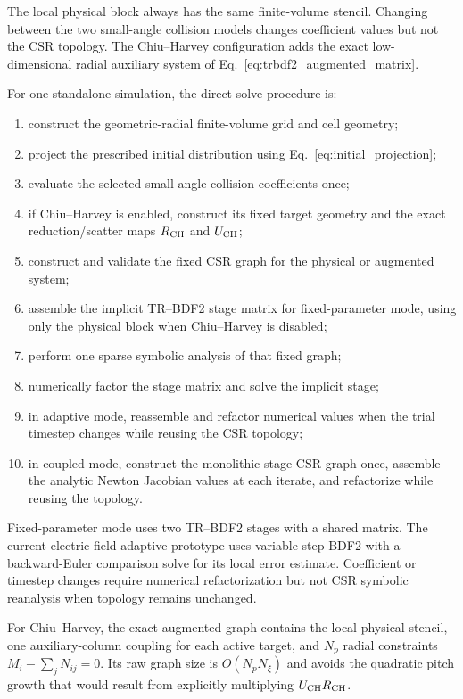 \documentclass[11pt]{article}
\begin{document}
The local physical block always has the same finite-volume stencil.  Changing between
the two small-angle collision models changes coefficient values but not the CSR topology.
The Chiu--Harvey configuration adds the exact low-dimensional radial auxiliary system of
Eq.~\eqref{eq:trbdf2_augmented_matrix}.

For one standalone simulation, the direct-solve procedure is:
\begin{enumerate}
 \item construct the geometric-radial finite-volume grid and cell geometry;
 \item project the prescribed initial distribution using Eq.~\eqref{eq:initial_projection};
 \item evaluate the selected small-angle collision coefficients once;
 \item if Chiu--Harvey is enabled, construct its fixed target geometry and the exact
       reduction/scatter maps $R_{\rm CH}$ and $U_{\rm CH}$;
 \item construct and validate the fixed CSR graph for the physical or augmented system;
 \item assemble the implicit TR--BDF2 stage matrix for fixed-parameter mode, using
       only the physical block when Chiu--Harvey is disabled;
 \item perform one sparse symbolic analysis of that fixed graph;
 \item numerically factor the stage matrix and solve the implicit stage;
 \item in adaptive mode, reassemble and refactor numerical values when the trial
       timestep changes while reusing the CSR topology;
 \item in coupled mode, construct the monolithic stage CSR graph once, assemble the
       analytic Newton Jacobian values at each iterate, and refactorize while reusing
       the topology.
\end{enumerate}
Fixed-parameter mode uses two TR--BDF2 stages with a shared matrix.  The current
electric-field adaptive prototype uses variable-step BDF2 with a backward-Euler
comparison solve for its local error estimate.  Coefficient or timestep changes require
numerical refactorization but not CSR symbolic reanalysis when topology remains unchanged.

For Chiu--Harvey, the exact augmented graph contains the local physical stencil, one
auxiliary-column coupling for each active target, and $N_p$ radial constraints
$M_i-\sum_jN_{ij}=0$.  Its raw graph size is $O(N_pN_\xi)$ and avoids the quadratic
pitch growth that would result from explicitly multiplying $U_{\rm CH}R_{\rm CH}$.
\end{document}
